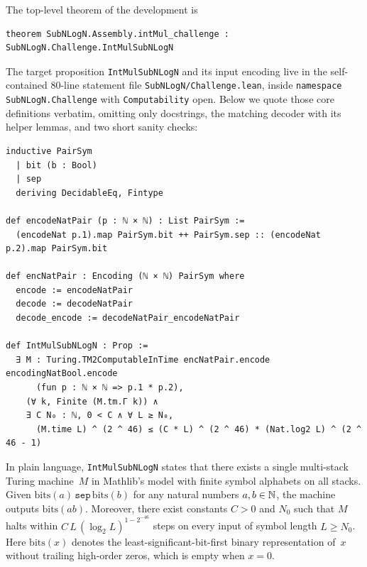 The top-level theorem of the development is
\begin{Verbatim}[fontsize=\small,frame=single,framesep=2mm]
theorem SubNLogN.Assembly.intMul_challenge : SubNLogN.Challenge.IntMulSubNLogN
\end{Verbatim}
The target proposition \texttt{IntMulSubNLogN} and its input encoding live in the self-contained 80-line statement file \texttt{SubNLogN/Challenge.lean}, inside \texttt{namespace SubNLogN.Challenge} with \texttt{Computability} open. Below we quote those core definitions verbatim, omitting only docstrings, the matching decoder with its helper lemmas, and two short sanity checks:
\begin{Verbatim}[fontsize=\small,frame=single,framesep=2mm]
inductive PairSym
  | bit (b : Bool)
  | sep
  deriving DecidableEq, Fintype

def encodeNatPair (p : ℕ × ℕ) : List PairSym :=
  (encodeNat p.1).map PairSym.bit ++ PairSym.sep :: (encodeNat p.2).map PairSym.bit

def encNatPair : Encoding (ℕ × ℕ) PairSym where
  encode := encodeNatPair
  decode := decodeNatPair
  decode_encode := decodeNatPair_encodeNatPair

def IntMulSubNLogN : Prop :=
  ∃ M : Turing.TM2ComputableInTime encNatPair.encode encodingNatBool.encode
      (fun p : ℕ × ℕ => p.1 * p.2),
    (∀ k, Finite (M.tm.Γ k)) ∧
    ∃ C N₀ : ℕ, 0 < C ∧ ∀ L ≥ N₀,
      (M.time L) ^ (2 ^ 46) ≤ (C * L) ^ (2 ^ 46) * (Nat.log2 L) ^ (2 ^ 46 - 1)
\end{Verbatim}

In plain language, \texttt{IntMulSubNLogN} states that there exists a single multi-stack Turing machine~$M$ in Mathlib's model with finite symbol alphabets on all stacks. Given $\mathrm{bits}(a)\,\mathtt{sep}\,\mathrm{bits}(b)$ for any natural numbers $a,b\in\mathbb{N}$, the machine outputs $\mathrm{bits}(ab)$. Moreover, there exist constants $C>0$ and $N_0$ such that $M$ halts within $C\,L\,(\log_2 L)^{1-2^{-46}}$ steps on every input of symbol length $L\ge N_0$. Here $\mathrm{bits}(x)$ denotes the least-significant-bit-first binary representation of~$x$ without trailing high-order zeros, which is empty when $x=0$.

